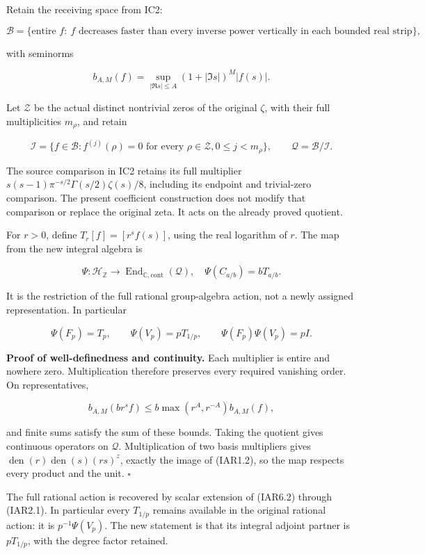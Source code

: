 \documentclass[
]{article}
\begin{document}
Retain the receiving space from IC2:

\[
\mathcal B=\{\text{entire }f:\ f\text{ decreases faster than every inverse power vertically in each bounded real strip}\},
\]

with seminorms

\[
b_{A,M}(f)=\sup_{|\Re s|\le A}(1+|\Im s|)^M|f(s)|.
\]

Let \(\mathscr Z\) be the actual distinct nontrivial zeros of the
original \(\zeta\), with their full multiplicities \(m_\rho\), and
retain

\[
\mathcal I=\{f\in\mathcal B:f^{(j)}(\rho)=0
\text{ for every }\rho\in\mathscr Z, 0\le j<m_\rho\},
\qquad \mathcal Q=\mathcal B/\mathcal I.
\tag{IAR6.1}
\]

The source comparison in IC2 retains its full multiplier
\(s(s-1)\pi^{-s/2}\Gamma(s/2)\zeta(s)/8\), including its endpoint and
trivial-zero comparison. The present coefficient construction does not
modify that comparison or replace the original zeta. It acts on the
already proved quotient.

For \(r>0\), define \(T_r[f]=[r^s f(s)]\), using the real logarithm of
\(r\). The map from the new integral algebra is

\[
\boxed{
\Psi:\mathcal H_{\mathbb Z}\longrightarrow
\operatorname{End}_{\mathbb C,\mathrm{cont}}(\mathcal Q),
\quad
\Psi(C_{a/b})=b T_{a/b}.}
\tag{IAR6.2}
\]

It is the restriction of the full rational group-algebra action, not a
newly assigned representation. In particular

\[
\Psi(F_p)=T_p,\qquad
\Psi(V_p)=pT_{1/p},\qquad
\Psi(F_p)\Psi(V_p)=pI.
\tag{IAR6.3}
\]

\textbf{Proof of well-definedness and continuity.} Each multiplier is
entire and nowhere zero. Multiplication therefore preserves every
required vanishing order. On representatives,

\[
b_{A,M}(b r^s f)\le b\max(r^A,r^{-A})b_{A,M}(f),
\tag{IAR6.4}
\]

and finite sums satisfy the sum of these bounds. Taking the quotient
gives continuous operators on \(\mathcal Q\). Multiplication of two
basis multipliers gives
\(\operatorname{den}(r)\operatorname{den}(s)(rs)^z\), exactly the image
of (IAR1.2), so the map respects every product and the unit. \(\square\)

The full rational action is recovered by scalar extension of (IAR6.2)
through (IAR2.1). In particular every \(T_{1/p}\) remains available in
the original rational action: it is \(p^{-1}\Psi(V_p)\). The new
statement is that its integral adjoint partner is \(pT_{1/p}\), with the
degree factor retained.
\end{document}
